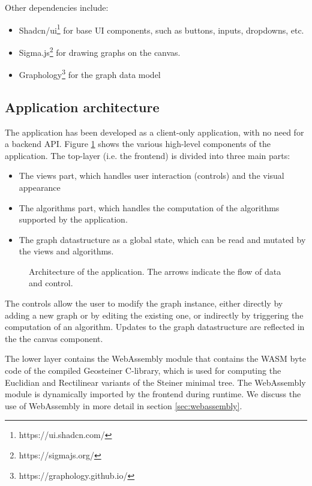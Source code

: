 \documentclass{l4proj}
\begin{document}
Other dependencies include:
\begin{itemize}
      \item Shadcn/ui\footnote{https://ui.shadcn.com/} for base UI components, such as buttons, inputs, dropdowns, etc.
      \item Sigma.js\footnote{https://sigmajs.org/} for drawing graphs on the canvas.
      \item Graphology\footnote{https://graphology.github.io/} for the graph data model
\end{itemize}

\subsection{Application architecture}
The application has been developed as a client-only application, with no need for a backend API. Figure \ref{fig:architecture} shows the various high-level components of the application. The top-layer (i.e. the frontend) is divided into three main parts:
\begin{itemize}
      \item The views part, which handles user interaction (controls) and the visual appearance
      \item The algorithms part, which handles the computation of the algorithms supported by the application.
      \item The graph datastructure as a global state, which can be read and mutated by the views and algorithms.
\end{itemize}

\begin{figure}[h]
      \centering
      
      \caption{Architecture of the application. The arrows indicate the flow of data and control.}
      \label{fig:architecture}
\end{figure}

The controls allow the user to modify the graph instance, either directly by adding a new graph or by editing the existing one, or indirectly by triggering the computation of an algorithm.
Updates to the graph datastructure are reflected in the the canvas component.

The lower layer contains the WebAssembly module that contains the WASM byte code of the compiled Geosteiner C-library, which is used for computing the Euclidian and Rectilinear variants of the Steiner minimal tree. The WebAssembly module is dynamically imported by the frontend during runtime.
We discuss the use of WebAssembly in more detail in section \ref{sec:webassembly}.
\end{document}
